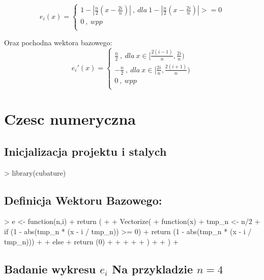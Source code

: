 \documentclass{article}
\begin{document}
\begin{equation*}
  e_i(x) = 
  \begin{cases}
  1 - |\frac{n}{2} (x - \frac{2i}{n})|\:,\: dla\: 1 - |\frac{n}{2} (x - \frac{2i}{n})|>=0 \\
  0\:, \: wpp \\
  \end{cases}
\end{equation*}


Oraz pochodna wektora bazowego:
\begin{equation*}
  e_i'(x) = 
  \begin{cases}
  \frac{n}{2}\:,\: dla\: x \in [\frac{2(i-1)}{n},\frac{2i}{n})\\
  -\frac{n}{2}\:,\: dla\: x \in [\frac{2i}{n},\frac{2(i+1)}{n})\\
  0\:, \: wpp \\
  \end{cases}
\end{equation*}

\section{Czesc numeryczna}
\subsection{Inicjalizacja projektu i stalych}
\begin{Schunk}
\begin{Sinput}
> library(cubature)
\end{Sinput}
\end{Schunk}

\subsection{Definicja Wektoru Bazowego:}
\begin{Schunk}
\begin{Sinput}
> e <- function(n,i){
+   return (
+     
+     Vectorize(
+       function(x){
+         tmp_n <- n/2
+         if (1 - abs(tmp_n * (x - i / tmp_n)) >= 0){
+           return (1 - abs(tmp_n * (x - i / tmp_n)))
+         }
+         else{
+           return (0)
+         }
+         
+         
+       }
+     )
+     
+   )
+ }
\end{Sinput}
\end{Schunk}
\subsection{Badanie wykresu \(e_i\) Na przykladzie \(n=4\)}
\end{document}
